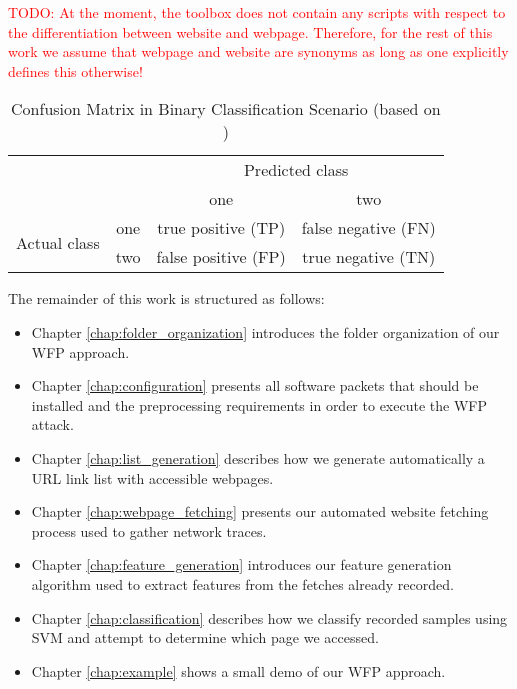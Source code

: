 

\textcolor{red}{TODO: At the moment, the toolbox does not contain any scripts with respect to the differentiation between website and webpage. Therefore, for the rest of this work we assume that webpage and website are synonyms as long as one explicitly defines this otherwise!}

\begin{table}[t]
\centering
\begin{tabular}{cc|c|c|}
	\cline{3-4}
	&&\multicolumn{2}{c|}{Predicted class}\\
	\cline{3-4}
	&&one&two\\
	\hline 
	\multicolumn{1}{|c|}{\multirow{2}{2.5cm}{Actual class}}&one&true positive (TP)&false negative (FN)\\
	\cline{2-4}
	\multicolumn{1}{|c|}{}&two&false positive (FP)& true negative (TN)\\
	\hline
\end{tabular}
\caption{Confusion Matrix in Binary Classification Scenario (based on \cite{Pennekamp2014})}
\label{tab:confusion}
\end{table}

The remainder of this work is structured as follows: 
\begin{itemize}
\item Chapter \ref{chap:folder_organization} introduces the folder organization of our \ac{WFP} approach.
\item Chapter \ref{chap:configuration} presents all software packets that should be installed and the preprocessing requirements in order to execute the \ac{WFP} attack.
\item Chapter \ref{chap:list_generation} describes how we generate automatically a \ac{URL} link list with accessible webpages.
\item Chapter \ref{chap:webpage_fetching} presents our automated website fetching process used to gather network traces.
\item Chapter \ref{chap:feature_generation} introduces our feature generation algorithm used to extract features from the fetches already recorded.
\item Chapter \ref{chap:classification} describes how we classify recorded samples using \ac{SVM} and attempt to determine which page we accessed.
\item Chapter \ref{chap:example} shows a small demo of our \ac{WFP} approach.
\end{itemize}

